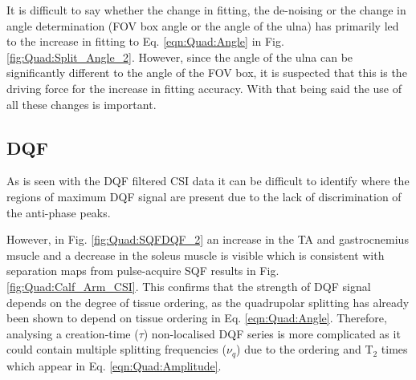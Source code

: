 It is difficult to say whether the change in fitting, the de-noising  or the change in angle determination (\ac{FOV} box angle or the angle of the ulna) has primarily led to the increase in fitting to Eq. \ref{eqn:Quad:Angle} in Fig. \ref{fig:Quad:Split_Angle_2}. However, since the angle of the ulna can be significantly different to the angle of the \ac{FOV} box, it is suspected that this is the driving force for the increase in fitting accuracy. With that being said the use of all these changes is important.

\subsection{DQF}

As is seen with the \ac{DQF} filtered \ac{CSI} data it can be difficult to identify where the regions of maximum \ac{DQF} signal are present due to the lack of discrimination of the anti-phase peaks. 

However, in Fig. \ref{fig:Quad:SQFDQF_2} an increase in the \ac{TA} and gastrocnemius msucle and a decrease in the soleus muscle is visible which is consistent with separation maps from pulse-acquire \ac{SQF} results in Fig. \ref{fig:Quad:Calf_Arm_CSI}. This confirms that the strength of \ac{DQF} signal depends on the degree of tissue ordering, as the quadrupolar splitting has already been shown to depend on tissue ordering in Eq. \ref{eqn:Quad:Angle}. Therefore, analysing a creation-time ($\tau$) non-localised \ac{DQF} series is more complicated as it could contain multiple splitting frequencies ($\nu_q$) due to the ordering and T$_2$ times which appear in Eq. \ref{eqn:Quad:Amplitude}. 



